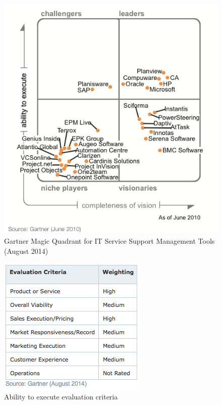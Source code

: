 \begin{figure}
\centering
\includegraphics{img/MQPPMTools.png}
\caption{Gartner Magic Quadrant for IT Service Support Management Tools (August 2014)}
\end{figure}

\begin{figure}
\centering
\includegraphics{img/AbilityToExecuteITSM.png}
\caption{Ability to execute evaluation criteria}
\end{figure}


